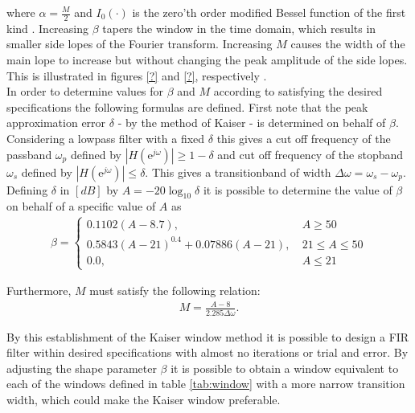where $\alpha=\frac{M}{2}$ and $I_0(\cdot)$ is the zero'th order modified Bessel function of the first kind \cite{DTSP, p.474-476}. Increasing $\beta$ tapers the window in the time domain, which results in smaller side lopes of the Fourier transform. Increasing $M$ causes the width of the main lope to increase but without changing the peak amplitude of the side lopes. This is illustrated in figures \ref{?} and \ref{?}, respectively .\\ 
In order to determine values for $\beta$ and $M$ according to  satisfying the desired specifications the following formulas are defined. First note that the peak approximation error $\delta$ - by the method of Kaiser - is determined on behalf of $\beta$. Considering a lowpass filter with a fixed $\delta$ this gives a cut off frequency of the passband $\omega_p$ defined by $|H(\text{e}^{j\omega})| \geq 1-\delta$ and cut off frequency of the stopband $\omega_s$ defined by $|H(\text{e}^{j\omega})| \leq \delta$. This gives a transitionband of width $\Delta \omega = \omega_s - \omega_p$. Defining $\delta$ in $[dB]$ by $A=-20\log_{10} \delta$ it is possible to determine the value of $\beta$ on behalf of a specific value of $A$ as 
\begin{align}
\beta =
\left\{ \begin{matrix}
0.1102\left( A-8.7 \right), &\ A \geq 50 \\
0.5843\left(A-21\right)^{0.4}+0.07886(A-21), &\ 21 \leq A \leq 50 \\
0.0, &\  A \leq 21 
\end{matrix}\right.
\end{align}
       
Furthermore, $M$ must satisfy the following relation:
\begin{align}
M=\frac{A-8}{2.285\Delta \omega}.
\end{align}

By this establishment of the Kaiser window method it is possible to design a FIR filter within desired specifications with almost no iterations or trial and error. By adjusting the shape parameter $\beta$ it is possible to obtain a window equivalent to each of the windows defined in table \ref{tab:window} with a more narrow transition width, which could make the Kaiser window preferable.       
   
